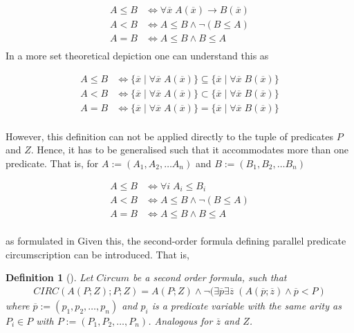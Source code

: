 \documentclass{article}
\newtheorem{mydef}[thm]{Definition}
\begin{document}
\begin{equation*}
\begin{split}
A \leq B & \iff  \forall \overline{x} \; A(\overline{x} ) \to B(\overline{x} ) \\
A < B & \iff A \leq B \wedge \neg (B \leq A) \\
A = B & \iff A \leq B \wedge B \leq A \\
\end{split}
\end{equation*}
In a more set theoretical depiction one can understand this as 

\begin{equation*}
\begin{split}
A \leq B & \iff  \{\overline{x} \mid  \forall \overline{x} \; A(\overline{x})\} \subseteq \{\overline{x} \mid  \forall \overline{x} \; B(\overline{x})\} \\
A < B & \iff  \{\overline{x} \mid  \forall \overline{x} \; A(\overline{x})\} \subset \{\overline{x} \mid  \forall \overline{x} \; B(\overline{x})\} \\
A = B & \iff  \{\overline{x} \mid  \forall \overline{x} \; A(\overline{x})\} = \{\overline{x} \mid  \forall \overline{x} \; B(\overline{x})\}\\
\end{split}
\end{equation*}

However, this definition can not be applied directly to the tuple of predicates $P$ and $Z$. Hence, it has to be generalised such that it accommodates more than one predicate.
That is, for $A:=(A_1,A_2,\dots A_n)$ and $B:=(B_1,B_2,\dots B_n)$

\begin{equation*}
\begin{split}
A \leq B & \iff  \forall i \; A_i \leq B_i \\
A < B & \iff A \leq B \wedge \neg (B \leq A) \\
A = B & \iff A \leq B \wedge B \leq A \\
\end{split}
\end{equation*}
 
as formulated in \cite{lifschitz1996circumscription}
Given this, the second-order formula defining parallel predicate circumscription can be introduced. That is, 

\begin{mydef}[\cite{lifschitz1996circumscription,brewka1997nonmonotonic}]
Let $Circum$ be a second order formula, such that
\begin{equation*}
\begin{split}
CIRC(A(P;Z);P;Z)=A(P;Z) \wedge \neg (\exists \overline{p} \exists  \overline{z} \; (A( \overline{p}; \overline{z}) \wedge  \overline{p} < P)
\end{split}
\end{equation*}
where $\overline{p}:=(p_1,p_2,\dots ,p_n)$ and $p_i$ is a predicate variable with the same arity as $P_i \in P$ with $P:=(P_1,P_2,\dots ,P_n)$. Analogous for $\overline{z}$ and $Z$.
\end{mydef} 
\end{document}
